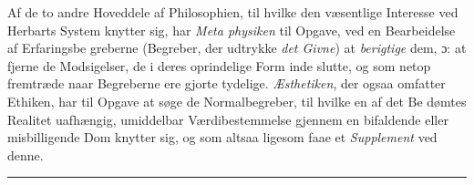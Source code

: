 \documentclass[12pt,a4paper]{book}
\newcommand{\divrule}{\begin{center}\rule{2cm}{0.4pt}\end{center}}
\begin{document}
Af de to andre Hoveddele af Philosophien, til hvilke den
væsentlige Interesse ved Herbarts System knytter sig, har \emph{Meta\-%
physiken} til Opgave, ved en Bearbeidelse af Erfaringsbe\-%
greberne (Begreber, der udtrykke \emph{det Givne}) at \emph{berigtige} dem,
ɔ: at fjerne de Modsigelser, de i deres oprindelige Form inde\-%
slutte, og som netop fremtræde naar Begreberne ere gjorte
tydelige. \emph{Æsthetiken}, der ogsaa omfatter Ethiken, har til
Opgave at søge de Normalbegreber, til hvilke en af det Be\-%
dømtes Realitet uafhængig, umiddelbar Værdibestemmelse
gjennem en bifaldende eller misbilligende Dom knytter sig, og
som altsaa ligesom faae et \emph{Supplement} ved denne.

\divrule
\end{document}
